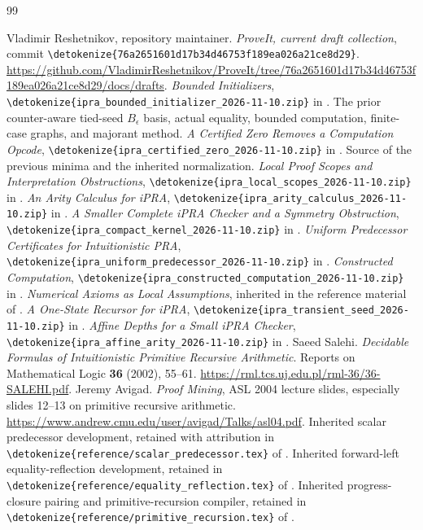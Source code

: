 \documentclass[11pt,letterpaper]{article}
\theoremstyle{definition}\newtheorem{definition}[theorem]{Definition}
\theoremstyle{remark}\newtheorem{remark}[theorem]{Remark}
\newcommand{\file}[1]{\expandafter\nolinkurl\expandafter{\detokenize{#1}}}
\begin{document}
\clearpage
\begin{thebibliography}{99}
\raggedright
{} Vladimir Reshetnikov, repository maintainer.
\emph{ProveIt, current draft collection}, commit
\file{76a2651601d17b34d46753f189ea026a21ce8d29}.
\url{https://github.com/VladimirReshetnikov/ProveIt/tree/76a2651601d17b34d46753f189ea026a21ce8d29/docs/drafts}.
 \emph{Bounded Initializers},
\file{ipra_bounded_initializer_2026-11-10.zip} in \cite{corpus}.
The prior counter-aware tied-seed $B_\epsilon$ basis, actual equality,
bounded computation, finite-case graphs, and majorant method.
 \emph{A Certified Zero Removes a Computation Opcode},
\file{ipra_certified_zero_2026-11-10.zip} in \cite{corpus}.
Source of the previous minima and the inherited normalization.
 \emph{Local Proof Scopes and Interpretation Obstructions},
\file{ipra_local_scopes_2026-11-10.zip} in \cite{corpus}.
 \emph{An Arity Calculus for iPRA},
\file{ipra_arity_calculus_2026-11-10.zip} in \cite{corpus}.
 \emph{A Smaller Complete iPRA Checker and a Symmetry Obstruction},
\file{ipra_compact_kernel_2026-11-10.zip} in \cite{corpus}.
 \emph{Uniform Predecessor Certificates for Intuitionistic PRA},
\file{ipra_uniform_predecessor_2026-11-10.zip} in \cite{corpus}.
 \emph{Constructed Computation},
\file{ipra_constructed_computation_2026-11-10.zip} in \cite{corpus}.
 \emph{Numerical Axioms as Local Assumptions}, inherited
in the reference material of \cite{arity,constructed}.
 \emph{A One-State Recursor for iPRA},
\file{ipra_transient_seed_2026-11-10.zip} in \cite{corpus}.
 \emph{Affine Depths for a Small iPRA Checker},
\file{ipra_affine_arity_2026-11-10.zip} in \cite{corpus}.
 Saeed Salehi. \emph{Decidable Formulas of Intuitionistic
Primitive Recursive Arithmetic}. Reports on Mathematical Logic
\textbf{36} (2002), 55--61.
\url{https://rml.tcs.uj.edu.pl/rml-36/36-SALEHI.pdf}.
 Jeremy Avigad. \emph{Proof Mining}, ASL 2004 lecture
slides, especially slides 12--13 on primitive recursive arithmetic.
\url{https://www.andrew.cmu.edu/user/avigad/Talks/asl04.pdf}.
 Inherited scalar predecessor development, retained with
attribution in \file{reference/scalar_predecessor.tex} of \cite{arity}.
 Inherited forward-left equality-reflection development,
retained in \file{reference/equality_reflection.tex} of \cite{arity}.
 Inherited progress-closure pairing and primitive-recursion
compiler, retained in \file{reference/primitive_recursion.tex} of \cite{arity}.
\end{thebibliography}
\end{document}
